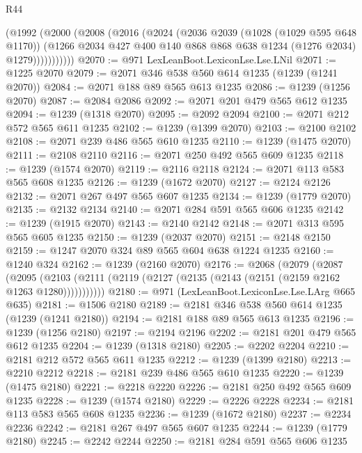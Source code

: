 \begin{lexlean}{R44}
\begin{coremodule}
            (@1992
              (@2000
                (@2008
                  (@2016
                    (@2024
                      (@2036
                        @2039
                        (@1028 (@1029 @595 @648 @1170))
                        (@1266
                          @2034
                          @427
                          @400
                          @140
                          @868
                          @868
                          @638
                          @1234
                          (@1276 @2034)
                          @1279)))))))))))
@2070 := @971 LexLeanBoot.LexiconLse.Lse.LNil
@2071 := @1225 @2070
@2079 := @2071 @346 @538 @560 @614 @1235 (@1239 (@1241 @2070))
@2084 := @2071 @188 @89 @565 @613 @1235
@2086 := @1239 (@1256 @2070)
@2087 := @2084 @2086
@2092 := @2071 @201 @479 @565 @612 @1235
@2094 := @1239 (@1318 @2070)
@2095 := @2092 @2094
@2100 := @2071 @212 @572 @565 @611 @1235
@2102 := @1239 (@1399 @2070)
@2103 := @2100 @2102
@2108 := @2071 @239 @486 @565 @610 @1235
@2110 := @1239 (@1475 @2070)
@2111 := @2108 @2110
@2116 := @2071 @250 @492 @565 @609 @1235
@2118 := @1239 (@1574 @2070)
@2119 := @2116 @2118
@2124 := @2071 @113 @583 @565 @608 @1235
@2126 := @1239 (@1672 @2070)
@2127 := @2124 @2126
@2132 := @2071 @267 @497 @565 @607 @1235
@2134 := @1239 (@1779 @2070)
@2135 := @2132 @2134
@2140 := @2071 @284 @591 @565 @606 @1235
@2142 := @1239 (@1915 @2070)
@2143 := @2140 @2142
@2148 := @2071 @313 @595 @565 @605 @1235
@2150 := @1239 (@2037 @2070)
@2151 := @2148 @2150
@2159 := @1247 @2070 @324 @89 @565 @604 @638 @1224 @1235
@2160 := @1240 @324
@2162 := @1239 (@2160 @2070)
@2176 := @2068
    (@2079
      (@2087
        (@2095 (@2103 (@2111 (@2119 (@2127 (@2135 (@2143 (@2151 (@2159 @2162 @1263 @1280)))))))))))
@2180 := @971 (LexLeanBoot.LexiconLse.Lse.LArg @665 @635)
@2181 := @1506 @2180
@2189 := @2181 @346 @538 @560 @614 @1235 (@1239 (@1241 @2180))
@2194 := @2181 @188 @89 @565 @613 @1235
@2196 := @1239 (@1256 @2180)
@2197 := @2194 @2196
@2202 := @2181 @201 @479 @565 @612 @1235
@2204 := @1239 (@1318 @2180)
@2205 := @2202 @2204
@2210 := @2181 @212 @572 @565 @611 @1235
@2212 := @1239 (@1399 @2180)
@2213 := @2210 @2212
@2218 := @2181 @239 @486 @565 @610 @1235
@2220 := @1239 (@1475 @2180)
@2221 := @2218 @2220
@2226 := @2181 @250 @492 @565 @609 @1235
@2228 := @1239 (@1574 @2180)
@2229 := @2226 @2228
@2234 := @2181 @113 @583 @565 @608 @1235
@2236 := @1239 (@1672 @2180)
@2237 := @2234 @2236
@2242 := @2181 @267 @497 @565 @607 @1235
@2244 := @1239 (@1779 @2180)
@2245 := @2242 @2244
@2250 := @2181 @284 @591 @565 @606 @1235

\end{coremodule}
\end{lexlean}
